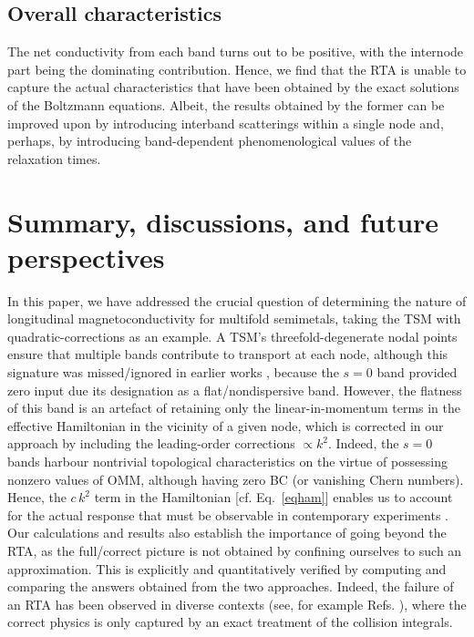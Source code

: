 \documentclass[aps,prb,onecolumn,nofootinbib,citeautoscript,10pt]{revtex4-2}
\begin{document}
\subsection{Overall characteristics}

The net conductivity from each band turns out to be positive, with the internode part being the dominating contribution.
Hence, we find that the RTA is unable to capture the actual characteristics that have been obtained by the exact solutions of the Boltzmann equations. Albeit, the results obtained by the former can be improved upon by introducing interband scatterings within a single node and, perhaps, by introducing band-dependent phenomenological values of the relaxation times.


\section{Summary, discussions, and future perspectives}
\label{secsum}

In this paper, we have addressed the crucial question of determining the nature of longitudinal magnetoconductivity for multifold semimetals, taking the TSM with quadratic-corrections as an example. A TSM's threefold-degenerate nodal points ensure that multiple bands contribute to transport at each node, although this signature was missed/ignored in earlier works \cite{ips-spin1-ph, girish-internode-spin1}, because the $s=0$ band provided zero input due its designation as a flat/nondispersive band. However, the flatness of this band is an artefact of retaining only the linear-in-momentum terms in the effective Hamiltonian in the vicinity of a given node, which is corrected in our approach by including the leading-order corrections $\propto k^2$. Indeed, the $s=0$ bands harbour nontrivial topological characteristics on the virtue of possessing nonzero values of OMM, although having zero BC (or vanishing Chern numbers). Hence, the $c\, k^2$ term in the Hamiltonian [cf. Eq.~\eqref{eqham}] enables us to account for the actual response that must be observable in contemporary experiments \cite{claudia-multifold}. Our calculations and results also establish the importance of going beyond the RTA, as the full/correct picture is not obtained by confining ourselves to such an approximation. This is explicitly and quantitatively verified by computing and comparing the answers obtained from the two approaches. Indeed, the failure of an RTA has been observed in diverse contexts (see, for example Refs. \cite{rta1, rta2}), where the correct physics is only captured by an exact treatment of the collision integrals.
\end{document}
